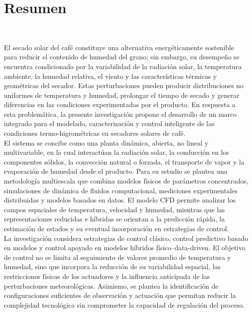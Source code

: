 \chapter*{Resumen}
~\newline~\newline~


El secado solar del café constituye una alternativa energéticamente sostenible para reducir el contenido de humedad del grano; sin embargo, su desempeño se encuentra condicionado por la variabilidad de la radiación solar, la temperatura ambiente, la humedad relativa, el viento y las características térmicas y geométricas del secador. Estas perturbaciones pueden producir distribuciones no uniformes de temperatura y humedad, prolongar el tiempo de secado y generar diferencias en las condiciones experimentadas por el producto. En respuesta a esta problemática, la presente investigación propone el desarrollo de un marco integrado para el modelado, caracterización y control inteligente de las condiciones termo-higrométricas en secadores solares de café.\\

El sistema se concibe como una planta dinámica, abierta, no lineal y multivariable, en la cual interactúan la radiación solar, la conducción en los componentes sólidos, la convección natural o forzada, el transporte de vapor y la evaporación de humedad desde el producto. Para su estudio se plantea una metodología multiescala que combina modelos físicos de parámetros concentrados, simulaciones de dinámica de fluidos computacional, mediciones experimentales distribuidas y modelos basados en datos. El modelo CFD permite analizar los campos espaciales de temperatura, velocidad y humedad, mientras que las representaciones reducidas e híbridas se orientan a la predicción rápida, la estimación de estados y su eventual incorporación en estrategias de control.\\

La investigación considera estrategias de control clásico, control predictivo basado en modelos y control apoyado en modelos híbridos físico–data-driven. El objetivo de control no se limita al seguimiento de valores promedio de temperatura y humedad, sino que incorpora la reducción de su variabilidad espacial, las restricciones físicas de los actuadores y la influencia anticipada de las perturbaciones meteorológicas. Asimismo, se plantea la identificación de configuraciones suficientes de observación y actuación que permitan reducir la complejidad tecnológica sin comprometer la capacidad de regulación del proceso.\\


